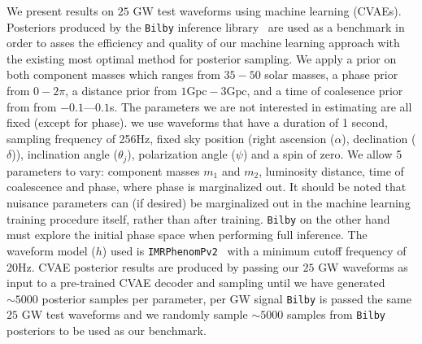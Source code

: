 \documentclass[%
showpacs,
 amsmath,amssymb,
 aps,
 twocolumn,
 prl,
 reprint,
floatfix,
]{revtex4-1}
\begin{document}
%
%
%
%
We present results on $25$ \ac{GW} test waveforms using machine learning 
(\ac{CVAE}s). Posteriors produced by the \texttt{Bilby} inference library~\cite{1811.02042} are used as a benchmark 
in order to asses the efficiency and quality of our machine learning approach 
with the existing most optimal method for posterior sampling. We apply a prior on both component masses which ranges from $35 - 50$
solar masses, a phase prior from $0 - 2\pi$, a distance prior from  $1\textrm{Gpc} - 3\textrm{Gpc}$, and a time of coalesence prior from
from $-0.1$---$0.1$s. The parameters we are not interested in estimating are all fixed (except for phase). we use waveforms that have a duration of 1 second, sampling frequency
of 256Hz, fixed sky position (right ascension ($\alpha$), declination ($\delta$)), inclination angle ($\theta_j$), polarization angle ($\psi$) and a spin of zero. We allow 5 parameters to vary: component masses $m_1$ and $m_2$, luminosity
distance, time of coalescence and phase, where phase is marginalized
out. It should be noted that nuisance parameters can (if desired) be 
marginalized out in the machine learning training procedure itself, rather 
than after training. \texttt{Bilby} on the other hand must explore the initial 
phase space when performing full inference. The waveform
model ($h$) used is
\texttt{IMRPhenomPv2}~\cite{1809.10113} with a minimum cutoff frequency of
20Hz. \ac{CVAE} posterior results are produced by passing our $25$ \ac{GW} 
waveforms as input to a pre-trained \ac{CVAE} decoder and sampling until we have 
generated $\sim5000$ posterior samples per parameter, per \ac{GW} signal 
\texttt{Bilby} is passed the same $25$ \ac{GW} test waveforms and we randomly sample $\sim5000$ samples from \texttt{Bilby} posteriors to be used as our benchmark.


%
%
\end{document}
